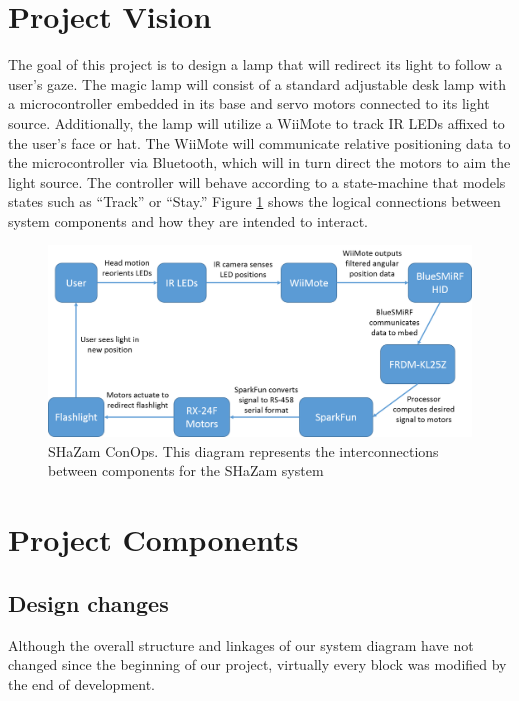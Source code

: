 \documentclass[conference, twocolumn]{IEEEtran}
\begin{document}
\section{Project Vision}

The goal of this project is to design a lamp that will redirect its light to follow a user's gaze. The magic lamp will consist of a standard adjustable desk lamp with a microcontroller embedded in its base and servo motors connected to its light source. Additionally, the lamp will utilize a WiiMote to track IR LEDs affixed to the user's face or hat. The WiiMote will communicate relative positioning data to the microcontroller via Bluetooth, which will in turn direct the motors to aim the light source. The controller will behave according to a state-machine that models states such as ``Track'' or ``Stay.'' Figure \ref{fig:conops} shows the logical connections between system components and how they are intended to interact.

\begin{figure}[!t]
\begin{center}
\includegraphics[width=\linewidth]{../images/conops2}
\end{center}

\caption{SHaZam ConOps. This diagram represents the interconnections between components for the SHaZam system}
\label{fig:conops}
\end{figure}

\section{Project Components}
\subsection{Design changes}
Although the overall structure and linkages of our system diagram have not changed since the beginning of our project, virtually every block was modified by the end of development.
\end{document}
